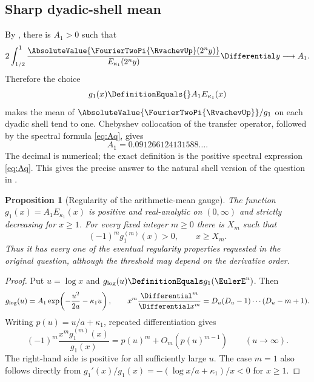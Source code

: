\documentclass[11pt,oneside]{article}
\numberwithin{equation}{section}
\newtheorem{proposition}[theorem]{Proposition}
\theoremstyle{definition}
\theoremstyle{remark}
\newcommand{\LogGaugeProfile}{g_{\log}}
\begin{document}
\subsection{Sharp dyadic-shell mean}

By , there is $A_1>0$ such that
\begin{equation}
 2\int_{1/2}^{1}
 \frac{\AbsoluteValue{\FourierTwoPi{\RvachevUp}(2^ny)}}{E_{\kappa_1}(2^ny)}\Differential y
 \longrightarrow A_1.
 \label{eq:L1-shell-mean}
\end{equation}
Therefore the choice
\begin{equation}
 g_1(x)\DefinitionEquals{}A_1E_{\kappa_1}(x)
 \label{eq:g1}
\end{equation}
makes the mean of $\AbsoluteValue{\FourierTwoPi{\RvachevUp}}/g_1$ on each dyadic shell tend to one.  Chebyshev
collocation of the transfer operator, followed by the spectral formula
\eqref{eq:Aq}, gives
\begin{equation}
 A_1=0.091266124131588\ldots .
 \label{eq:A1-numeric}
\end{equation}
The decimal is numerical; the exact definition is the positive spectral expression
\eqref{eq:Aq}.  This gives the precise answer to the natural shell version of the question
in \cite{mse-decay}.

\begin{proposition}[Regularity of the arithmetic-mean gauge]
\label{prop:gauge-regularity}
The function $g_1(x)=A_1E_{\kappa_1}(x)$ is positive and real-analytic on $(0,\infty)$ and
strictly decreasing for $x\ge1$.  For every fixed integer $m\ge0$ there is $X_m$ such that
\begin{equation}
 (-1)^m g_1^{(m)}(x)>0,\qquad x\ge X_m.
 \label{eq:eventual-alternating-derivatives}
\end{equation}
Thus it has every one of the eventual regularity properties requested in the original
question, although the threshold may depend on the derivative order.
\end{proposition}

\begin{proof}
Put $u=\log x$ and
$\LogGaugeProfile(u)\DefinitionEquals g_1(\EulerE^u)$.  Then
\[
 \LogGaugeProfile(u)=A_1\exp\!\left(-\frac{u^2}{2a}-\kappa_1u\right),
 \qquad
 x^m\frac{\Differential^m}{\Differential x^m}
 =D_u(D_u-1)\cdots(D_u-m+1).
\]
Writing $p(u)=u/a+\kappa_1$, repeated differentiation gives
\[
 (-1)^m\frac{x^mg_1^{(m)}(x)}{g_1(x)}
 =p(u)^m+O_m(p(u)^{m-1})
 \qquad(u\to\infty).
\]
The right-hand side is positive for all sufficiently large $u$.  The case $m=1$ also follows
directly from $g_1'(x)/g_1(x)=-(\log x/a+\kappa_1)/x<0$ for $x\ge1$.
\end{proof}
\end{document}
